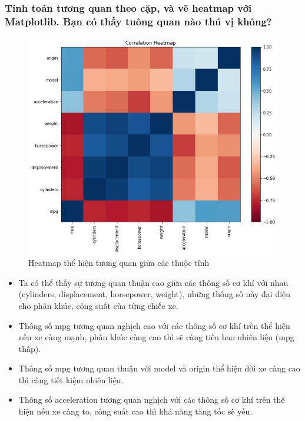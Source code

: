 \documentclass[a4paper, 12pt]{article}
\begin{document}
    \subsubsection{Tính toán tương quan theo cặp, và vẽ heatmap với Matplotlib. Bạn có thấy tuông quan nào thú vị không?}
        \begin{figure}[H]
            \centering
                \includegraphics[scale=0.5]{img/heatmap.png}
                \caption{Heatmap thể hiện tương quan giữa các thuộc tính}
        \end{figure}
        
        \begin{itemize}
            \item Ta có thể thấy sự tương quan thuận cao giữa các thông số cơ khí với nhau (cylinders, displacement, horsepower, weight), những thông số này đại diện cho phân khúc, công suất của từng chiếc xe.
            \item Thông số mpg tương quan nghịch cao với các thông số cơ khí trên thể hiện nếu xe càng mạnh, phân khúc càng cao thì sẽ càng tiêu hao nhiên liệu (mpg thấp).
            \item Thông số mpg tương quan thuận với model và origin thể hiện đời xe càng cao thì càng tiết kiệm nhiên liệu.
            \item Thông số acceleration tương quan nghịch với các thông số cơ khí trên thể hiện nếu xe càng to, công suất cao thì khả năng tăng tốc sẽ yếu.
        \end{itemize}
        
\end{document}
